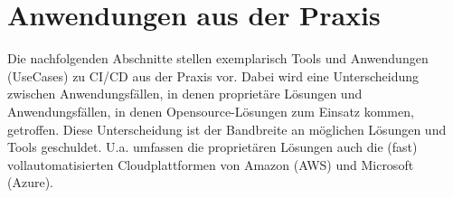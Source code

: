 \section{Anwendungen aus der Praxis}
\label{Anwendungen aus der Praxis}
Die nachfolgenden Abschnitte stellen exemplarisch Tools und Anwendungen (UseCases) zu \acrshort{CI}/\acrshort{CD} aus der Praxis vor. Dabei wird eine Unterscheidung zwischen Anwendungsfällen, in denen proprietäre Lösungen und Anwendungsfällen, in denen Opensource-Lösungen zum Einsatz kommen, getroffen. Diese Unterscheidung ist der Bandbreite an möglichen Lösungen und Tools geschuldet. U.a. umfassen die proprietären Lösungen auch die (fast) vollautomatisierten Cloudplattformen von Amazon (\acrshort{AWS}) und Microsoft (Azure).